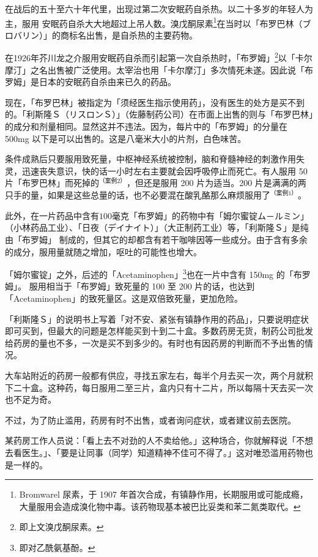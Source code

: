 \documentclass[UTF8]{ctexart}
\begin{document}
在战后的五十至六十年代里，出现过第二次安眠药自杀热。以二十多岁的年轻人为主，服用
安眠药自杀大大地超过上吊人数。溴戊酮尿素\footnote{Bromwarel 尿素，于 1907 年首次合成，有镇静作用，长期服用或可能成瘾，大量服用会造成溴化物中毒。该药物现基本被巴比妥类和苯二氮类取代。}在当时以「布罗巴林（ブロバリン）」的商标名出售，是自杀热的主要药物。

在1926年芥川龙之介服用安眠药自杀而引起第一次自杀热时，「布罗姆」\footnote{即上文溴戊酮尿素。}以「卡尔摩汀」之名出售被广泛使用。太宰治也用「卡尔摩汀」多次情死未遂。因此说「布罗姆」是日本的安眠药自杀由来已久的药品。

现在，「布罗巴林」被指定为「须经医生指示使用药」，没有医生的处方是买不到的。「利斯隆Ｓ（リスロンＳ）」（佐藤制药公司）在市面上出售的则与「布罗巴林」的成分和剂量相同。显然这并不违法。因为，每片中的「布罗姆」的分量在 500mg 以下是可以出售的。这是八毫米大小的片剂，白色味苦。

条件成熟后只要服用致死量，中枢神经系统被控制，脑和脊髓神经的刺激作用失灵，迅速丧失意识，快的话一小时左右主要就会因呼吸停止而死亡。有人服用 50 片「布罗巴林」而死掉的$^{（案例2）}$，但还是服用 200 片为适当。200 片是满满的两只手的量，如果是这些总量的话，也不必要混在酸乳酪那么麻烦服用了$^{（案例1）}$。

此外，在一片药品中含有$100$毫克「布罗姆」的药物中有「姆尔蜜锭ム－ルミン」（小林药品工业）、「日夜（デイナイト）」（大正制药工业）等，「利斯隆Ｓ」是纯由「布罗姆」 制成的，但其它的却都含有若干咖啡因等一些成分。由于含有多余的成分，服用量就随之增加，呕吐的可能性也增大。

「姆尔蜜锭」之外，后述的「Acetaminophen」\footnote{即对乙酰氨基酚。}也在一片中含有 150mg 的「布罗姆」。 服用相当于「布罗姆」致死量的 100 至 200 片的话，也达到「Acetaminophen」的致死量区。这是双倍致死量，更加危险。

「利斯隆Ｓ」的说明书上写着「对不安、紧张有镇静作用的药品」，只要说明症状即可买到，但最大的问题是怎样能买到十到二十盒。多数药房无货，制药公司批发给药房的量也不多，一次是买不到多少的。有时也有因药房的判断而不予出售的情况。

大车站附近的药房一般都有供应，寻找五家左右，每半个月去买一次，两个月就积下二十盒。这种药，每日服用二至三片，盒内只有十二片，所以每隔十天去买一次也不足为奇。

不过，为了防止滥用，药房有时不出售，或者询问症状，或者建议前去医院。

某药房工作人员说：「看上去不对劲的人不卖给他。」这种场合，你就解释说「不想去看医生。」、「要是让同事（同学）知道精神不佳可不得了。」这对唯恐滥用药物也是一样的。
\end{document}
